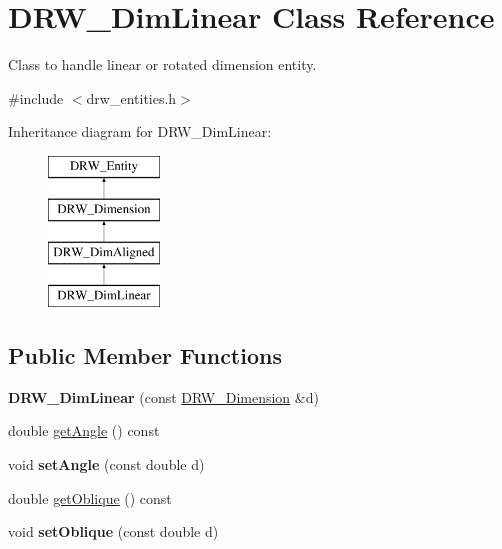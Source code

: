 \hypertarget{classDRW__DimLinear}{\section{D\-R\-W\-\_\-\-Dim\-Linear Class Reference}
\label{classDRW__DimLinear}
}


Class to handle linear or rotated dimension entity.  




{\ttfamily \#include $<$drw\-\_\-entities.\-h$>$}

Inheritance diagram for D\-R\-W\-\_\-\-Dim\-Linear\-:\begin{figure}[H]
\begin{center}
\leavevmode
\includegraphics[height=4.000000cm]{classDRW__DimLinear}
\end{center}
\end{figure}
\subsection*{Public Member Functions}
\begin{DoxyCompactItemize}
\item 
\hypertarget{classDRW__DimLinear_a429e214f73b44200f3700d117071bba1}{{\bfseries D\-R\-W\-\_\-\-Dim\-Linear} (const \hyperlink{classDRW__Dimension}{D\-R\-W\-\_\-\-Dimension} \&d)}\label{classDRW__DimLinear_a429e214f73b44200f3700d117071bba1}

\item 
double \hyperlink{classDRW__DimLinear_ab383c82c37c4a4db5b91c2d56676cf89}{get\-Angle} () const 
\item 
\hypertarget{classDRW__DimLinear_a79fd95c3e602f5c6acf620ef814f84b2}{void {\bfseries set\-Angle} (const double d)}\label{classDRW__DimLinear_a79fd95c3e602f5c6acf620ef814f84b2}

\item 
double \hyperlink{classDRW__DimLinear_a0ca1a1e9273e6ed0ac400a9352d6fb93}{get\-Oblique} () const 
\item 
\hypertarget{classDRW__DimLinear_a9ae6c4ea6666a5b5af1340320759184a}{void {\bfseries set\-Oblique} (const double d)}\label{classDRW__DimLinear_a9ae6c4ea6666a5b5af1340320759184a}

\end{DoxyCompactItemize}

